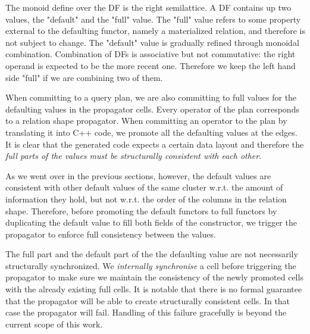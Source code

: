 \begin{code}

  \caption{\label{lst:defaulting_semigroup}The monoid define over the DF
  is the right semilattice. A DF contains up  two values, the "default" and the "full" value.
  The "full" value refers to some property external to the defaulting functor, namely a
  materialized relation, and therefore is not subject to change. The "default" value
  is gradually refined through monoidal combination. Combination of DFs is associative but not
  commutative: the right operand is expected to be the more recent one. Therefore
  we keep the left hand side "full" if we are combining two of them.}
\end{code}

When committing to a query plan, we are also committing to full values
for the defaulting values in the propagator cells. Every operator of
the plan corresponds to a relation shape propagator. When committing
an operator to the plan by translating it into C++ code, we promote
all the defaulting values at the edges. It is clear that the generated
code expects a certain data layout and therefore the \emph{full parts
of the values must be structurally consistent with each other}.

As we went over in the previous sections, however, the default values
are consistent with other default values of the same cluster
w.r.t. the amount of information they hold, but not w.r.t. the order
of the columns in the relation shape. Therefore, before promoting the
default functors to full functors by duplicating the default value to
fill both fields of the  constructor, we trigger
the propagator to enforce full consistency between the
 values.

The full part and the default part of the the defaulting value are not
necessarily structurally synchronized. We \emph{internally
synchronise} a cell before triggering the propagator to make sure we
maintain the consistency of the newly promoted cells with the already
existing full cells. It is notable that there is no formal guarantee that the propagator
will be able to create structurally consistent cells. In that case the
propagator will fail. Handling of this failure gracefully is beyond
the current scope of this work.

